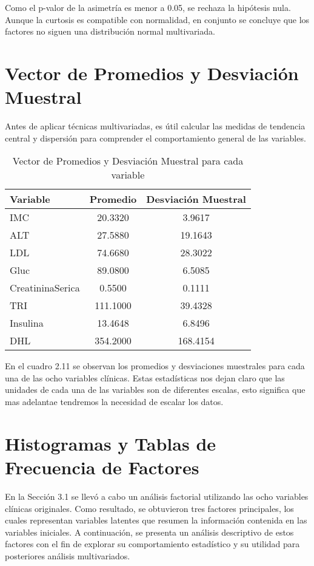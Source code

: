 \documentclass[12pt]{report}
\begin{document}
\noindent Como el p-valor de la asimetría es menor a 0.05, se rechaza la hipótesis nula. Aunque la curtosis es compatible con normalidad, en conjunto se concluye que los factores no siguen una distribución normal multivariada.

\newpage

\section{Vector de Promedios y Desviación Muestral}
Antes de aplicar técnicas multivariadas, es útil calcular las medidas de tendencia central y dispersión para comprender el comportamiento general de las variables.

\begin{table}[H]
\centering
\begin{tabular}{|l|c|c|}
\hline
\textbf{Variable} & \textbf{Promedio} & \textbf{Desviación Muestral} \\
\hline
IMC & 20.3320 & 3.9617 \\
ALT & 27.5880 & 19.1643 \\
LDL & 74.6680 & 28.3022 \\
Gluc & 89.0800 & 6.5085 \\
CreatininaSerica & 0.5500 & 0.1111 \\
TRI & 111.1000 & 39.4328 \\
Insulina & 13.4648 & 6.8496 \\
DHL & 354.2000 & 168.4154 \\
\hline
\end{tabular}
\caption{Vector de Promedios y Desviación Muestral para cada variable}
\end{table}

\noindent En el cuadro 2.11 se observan los promedios y desviaciones muestrales para cada una de las ocho variables clínicas. Estas estadísticas nos dejan claro que las unidades de cada una de las variables son de diferentes escalas, esto significa que mas adelantae tendremos la necesidad de escalar los datos.
\newpage
\section{Histogramas y Tablas de Frecuencia de Factores}
En la Sección 3.1 se llevó a cabo un análisis factorial utilizando las ocho variables clínicas originales. Como resultado, se obtuvieron tres factores principales, los cuales representan variables latentes que resumen la información contenida en las variables iniciales. A continuación, se presenta un análisis descriptivo de estos factores con el fin de explorar su comportamiento estadístico y su utilidad para posteriores análisis multivariados.
\end{document}
